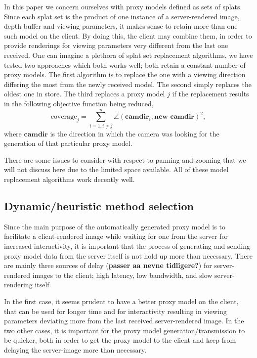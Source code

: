 In this paper we concern ourselves with proxy models defined as sets of
splats. Since each splat set is the product of one instance of a server-rendered
image, depth buffer and viewing parameters, it makes sense to retain more than
one such model on the client. By doing this, the client may combine them, in
order to provide renderings for viewing parameters very different from the last
one received. One can imagine a plethora of splat set replacement algorithms, we
have tested two approaches which both works well; both retain a constant number
of proxy models. The first algorithm is to replace the one with a viewing
direction differing the most from the newly received model. The second simply
replaces the oldest one in store. The third replaces a proxy model $j$ if the
replacement results in the following objective function being reduced,
\[
  \text{coverage}_j = 
  \sum_{i=1, i\neq j}^n 
    \angle(\textbf{camdir}_i, \textbf{new camdir} )^2,
\]
where $\textbf{camdir}$ is the direction in which the camera was looking for the
generation of that particular proxy model.

There are some issues to consider with respect to panning and zooming that we
will not discuss here due to the limited space available.  All of these model
replacement algorithms work decently well.



\subsection{Dynamic/heuristic method selection}

Since the main purpose of the automatically generated proxy model is to
facilitate a client-rendered image while waiting for one from the server for
increased interactivity, it is important that the process of generating and
sending proxy model data from the server itself is not hold up more than
necessary. There are mainly three sources of delay (\textbf{passer aa nevne
tidligere?}) for server-rendered images to the client; high
latency, low bandwidth, and slow server-rendering itself.

In the first case, it seems prudent to have a better proxy model on the client,
that can be used for longer time and for interactivity resulting in viewing
parameters deviating more from the last received server-rendered image. In the
two other cases, it is important for the proxy model generation/transmission to
be quicker, both in order to get the proxy model to the client and keep from
delaying the server-image more than necessary.

